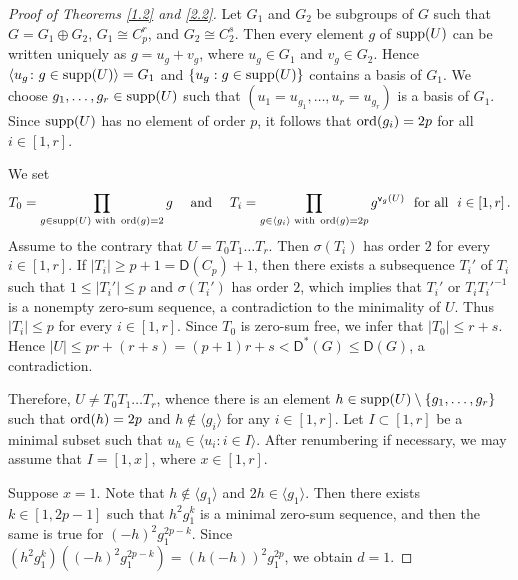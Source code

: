 \documentclass[a4paper,10pt]{amsart}
\theoremstyle{plain}
\theoremstyle{definition}
\numberwithin{equation}{section}
\begin{document}
\begin{proof}[Proof of Theorems \ref{1.2} and \ref{2.2}]
Let $G_1$ and $G_2$ be subgroups of $G$ such that $G=G_1\oplus G_2$,  $G_1 \cong C_p^r $, and $G_2\cong C_2^s$. Then every element $g$ of $\operatorname{supp}(U)$ can be written uniquely as $g=u_g+v_g$, where $u_g\in G_1$ and $v_g\in G_2$. Hence $\langle u_g\colon g\in \operatorname{supp}(U)\rangle=G_1$ and $\{u_g: g\in \operatorname{supp}(U)\}$ contains a basis of $G_1$. We choose $g_1, \ldots, g_r\in \operatorname{supp}(U)$ such that $(u_1=u_{g_1}, \ldots, u_r=u_{g_r})$ is a basis of $G_1$. Since $\operatorname{supp}(U)$ has no element of order $p$, it follows that $\operatorname{ord}(g_i)=2p$ for all $i\in [1,r]$.

We set
\[
T_0=\prod_{g\in \operatorname{supp}(U)\text{ with }\operatorname{ord}(g)=2}g \quad \text{ and } \quad T_i=\prod_{g\in \langle g_i\rangle \text{ with }\operatorname{ord}(g)=2p}g^{\mathsf v_{g}(U)} \ \text{ for all } \ i\in [1,r] \,.
\]
Assume to the contrary that $U=T_0T_1\ldots T_r$. Then $\sigma(T_i)$ has order $2$ for every $i\in [1,r]$. If $|T_i|\ge p+1=\mathsf D(C_p)+1$, then there exists a subsequence $T_i'$ of $T_i$ such that $1\le |T_i'|\le p$ and $\sigma(T_i')$ has order $2$, which implies that $T_i'$ or $T_iT_i'^{-1}$ is a nonempty zero-sum sequence, a contradiction to the minimality of $U$.	
Thus $|T_i|\le p$ for every $i\in [1,r]$. Since $T_0$ is zero-sum free, we infer that $|T_0|\le r+s$.
Hence $|U|\le pr+(r+s)=(p+1)r+s<\mathsf D^*(G)\le \mathsf D(G)$, a contradiction.

Therefore, $U \ne T_0T_1\ldots T_r$, whence there is an element $h\in \operatorname{supp}(U)\setminus \{g_1,\ldots, g_r\}$ such that $\operatorname{ord}(h)=2p$ and $h\not\in \langle g_i\rangle$ for any $i\in [1,r]$.
Let $I\subset [1,r]$ be a minimal subset such that $u_h\in \langle u_i\colon i\in I\rangle$.
After renumbering if necessary, we may assume that $I=[1,x]$, where $x\in [1,r]$.


Suppose $x=1$. Note that $h\not\in \langle g_1\rangle$ and $2h\in \langle g_1\rangle$. Then there exists $k\in [1, 2p-1]$ such that $h^2g_1^k$ is a minimal zero-sum sequence,  and then the same is true for $(-h)^2g_1^{2p-k}$. Since  $(h^2g_1^k) ((-h)^2g_1^{2p-k})=(h(-h))^2 g_1^{2p}$, we obtain $d=1$.



\end{proof}
\end{document}
